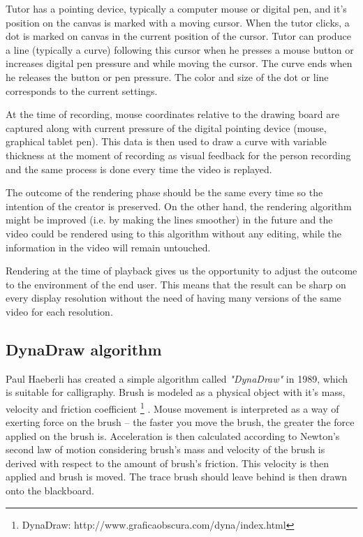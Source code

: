Tutor has a pointing device, typically a computer mouse or digital pen, and it's position on the canvas is marked with a moving cursor. When the tutor clicks, a dot is marked on canvas in the current position of the cursor. Tutor can produce a line (typically a curve) following this cursor when he presses a mouse button or increases digital pen pressure and while moving the cursor. The curve ends when he releases the button or pen pressure. The color and size of the dot or line corresponds to the current settings.

At the time of recording, mouse coordinates relative to the drawing board are captured along with current pressure of the digital pointing device (mouse, graphical tablet pen). This data is then used to draw a curve with variable thickness at the moment of recording as visual feedback for the person recording and the same process is done every time the video is replayed.

The outcome of the rendering phase should be the same every time so the intention of the creator is preserved. On the other hand, the rendering algorithm might be improved (i.e. by making the lines smoother) in the future and the video could be rendered using to this algorithm without any editing, while the information in the video will remain untouched.

Rendering at the time of playback gives us the opportunity to adjust the outcome to the environment of the end user. This means that the result can be sharp on every display resolution without the need of having many versions of the same video for each resolution.

\subsection{DynaDraw algorithm}
\label{sec:dynadraw}

Paul Haeberli has created a simple algorithm called \textit{"DynaDraw"} in 1989, which is suitable for calligraphy. Brush is modeled as a physical object with it's mass, velocity and friction coefficient \footnote{DynaDraw: http://www.graficaobscura.com/dyna/index.html} \cite{}. Mouse movement is interpreted as a way of exerting force on the brush -- the faster you move the brush, the greater the force applied on the brush is. Acceleration is then calculated according to Newton's second law of motion considering brush's mass and velocity of the brush is derived with respect to the amount of brush's friction. This velocity is then applied and brush is moved. The trace brush should leave behind is then drawn onto the blackboard.

